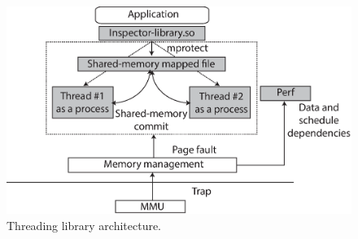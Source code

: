 
\begin{figure}[t]

\centering
      \includegraphics[scale=.35]{figure/Library-architecture}
  \caption{Threading library architecture.}
   
  \label{fig:lib-architecture}

\end{figure}
